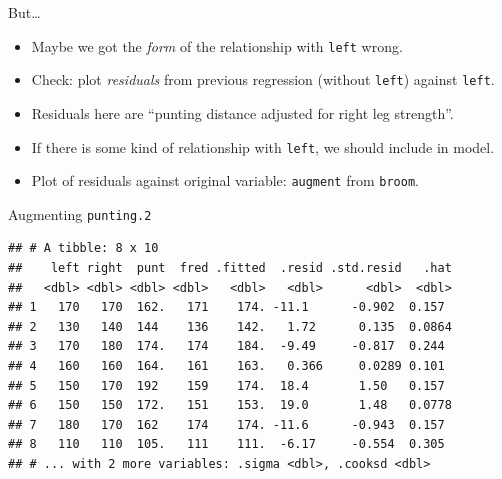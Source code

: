 \documentclass[
  ignorenonframetext,
]{beamer}
\newenvironment{Shaded}{\begin{snugshade}}{\end{snugshade}}
\newcommand{\DecValTok}[1]{\textcolor[rgb]{0.00,0.00,0.81}{#1}}
\newcommand{\FloatTok}[1]{\textcolor[rgb]{0.00,0.00,0.81}{#1}}
\newcommand{\KeywordTok}[1]{\textcolor[rgb]{0.13,0.29,0.53}{\textbf{#1}}}
\newcommand{\NormalTok}[1]{#1}
\newcommand{\OperatorTok}[1]{\textcolor[rgb]{0.81,0.36,0.00}{\textbf{#1}}}
\newcommand{\StringTok}[1]{\textcolor[rgb]{0.31,0.60,0.02}{#1}}
\begin{document}
\begin{frame}[fragile]{But\ldots}
\protect\hypertarget{but}{}

\begin{itemize}
\item
  Maybe we got the \emph{form} of the relationship with \texttt{left}
  wrong.
\item
  Check: plot \emph{residuals} from previous regression (without
  \texttt{left}) against \texttt{left}.
\item
  Residuals here are ``punting distance adjusted for right leg
  strength''.
\item
  If there is some kind of relationship with \texttt{left}, we should
  include in model.
\item
  Plot of residuals against original variable: \texttt{augment} from
  \texttt{broom}.
\end{itemize}

\end{frame}

\begin{frame}[fragile]{Augmenting \texttt{punting.2}}
\protect\hypertarget{augmenting-punting.2}{}

\footnotesize

\begin{Shaded}
\end{Shaded}

\begin{verbatim}
## # A tibble: 8 x 10
##    left right  punt  fred .fitted  .resid .std.resid   .hat
##   <dbl> <dbl> <dbl> <dbl>   <dbl>   <dbl>      <dbl>  <dbl>
## 1   170   170  162.   171    174. -11.1      -0.902  0.157 
## 2   130   140  144    136    142.   1.72      0.135  0.0864
## 3   170   180  174.   174    184.  -9.49     -0.817  0.244 
## 4   160   160  164.   161    163.   0.366     0.0289 0.101 
## 5   150   170  192    159    174.  18.4       1.50   0.157 
## 6   150   150  172.   151    153.  19.0       1.48   0.0778
## 7   180   170  162    174    174. -11.6      -0.943  0.157 
## 8   110   110  105.   111    111.  -6.17     -0.554  0.305 
## # ... with 2 more variables: .sigma <dbl>, .cooksd <dbl>
\end{verbatim}

\normalsize

\end{frame}
\end{document}
